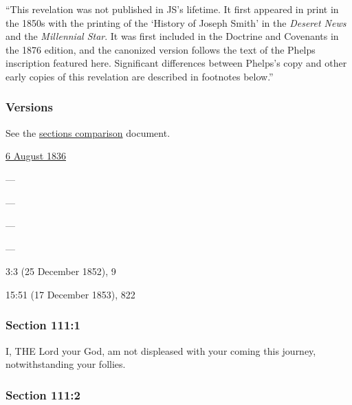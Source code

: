 			``This revelation was not published in JS's lifetime. It first appeared in print in the 1850s with the printing of the `History of Joseph Smith' in the \textit{Deseret News} and the \textit{Millennial Star}. It was first included in the Doctrine and Covenants in the 1876 edition, and the canonized version follows the text of the Phelps inscription featured here. Significant differences between Phelps's copy and other early copies of this revelation are described in footnotes below.''
					
	\subsubsection{Versions}
		\label{DC111-V}
		
		See the \href{https://drive.google.com/file/d/1goAvNz8jS4R8slYfMG_db55Ty2z_vmgK/view?usp=sharing}{sections comparison} document.
	
		\begin{compactdesc}
			\item[JSP] \hyperref[EMS-1836-JS-6-AUG-1836]{6 August 1836}
			\item[BC] ---
			\item[DC 1835] ---
			\item[DC 1844] ---
			\item[TS] ---
			\item[DN] 3:3 (25 December 1852), 9
			\item[MS] 15:51 (17 December 1853), 822
		\end{compactdesc}

	\subsubsection{Section 111:1} %
		\label{DC111-1}

		I, THE Lord your God, am not displeased with your coming this journey, notwithstanding your follies.


	\subsubsection{Section 111:2} %
		\label{DC111-2}

